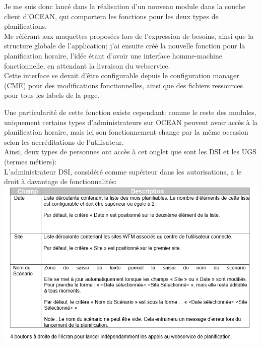 \documentclass{rapport}
\begin{document}
\begin{minipage}{0.35\textwidth}
\end{minipage}
\begin{minipage}{0.55\textwidth}
Je me suis donc lancé dans la réalisation d'un nouveau module dans la couche client d'OCEAN, qui comportera les fonctions pour les deux types de planifications.\\
Me référant aux maquettes proposées lors de l'expression de besoins, ainsi que la structure globale de l'application; j'ai ensuite créé la nouvelle fonction pour la planification horaire, l'idée étant d'avoir une interface homme-machine fonctionnelle, en attendant la livraison du webservice.\\

Cette interface se devait d'être configurable depuis le configuration manager (CME) pour des modifications fonctionnelles, ainsi que des fichiers ressources pour tous les labels de la page.
\end{minipage}
\vspace{5mm} %

Une particularité de cette fonction existe cependant: comme le reste des modules, uniquement certains types d'administrateurs sur OCEAN peuvent avoir accès à la planification horaire, mais ici son fonctionnement change par la même occasion selon les accréditations de l'utilisateur.\\
Ainsi, deux types de personnes ont accès à cet onglet que sont les DSI et les UGS (termes métiers):\\

L'administrateur DSI, considéré comme supérieur dans les autorisations, a le droit à davantage de fonctionnalités:\\
\includegraphics[width=.95\textwidth]{fig/fig18_PlanoHDSIFonct.png}
\end{document}
